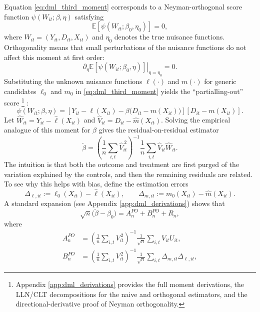 \documentclass[11pt,oneside,a4paper]{book}
\begin{document}
Equation \eqref{eq:dml_third_moment} corresponds to a Neyman-orthogonal score function \(\psi(W_{it};\beta,\eta)\) satisfying \[ 
\mathbb{E}[\psi(W_{it};\beta_0,\eta_0)] = 0, \] where \(W_{it}=(Y_{it},D_{it},X_{it})\) and \(\eta_0\) denotes the true nuisance functions. Orthogonality means that small perturbations of the nuisance functions do not affect this moment at first order:
\begin{equation*}
\left.
\partial_{\eta}
\mathbb{E}\!\left[\psi(W_{it};\beta_0,\eta)\right]
\right|_{\eta=\eta_0}
=0.
\end{equation*}
Substituting the unknown nuisance functions \(\ell(\cdot)\) and \(m(\cdot)\) for generic candidates \(\ell_0\) and \(m_0\) in \eqref{eq:dml_third_moment} yields the “partialling-out” score \footnote{Appendix \ref{app:dml_derivations} provides the full moment derivations, the LLN/CLT decompositions for the naive and orthogonal estimators, and the directional-derivative proof of Neyman orthogonality.} :
\begin{equation}
\psi(W_{it};\beta,\eta)
=
\left[
Y_{it}-\ell(X_{it})
-\beta\bigl(D_{it}-m(X_{it})\bigr)
\right]
\left[
D_{it}-m(X_{it})
\right].
\label{eq:dml_background_score}
\end{equation}
Let \(\hat W_{it} = Y_{it}-\hat\ell(X_{it})\) and \(\hat V_{it} = D_{it}-\hat m(X_{it})\).  Solving the empirical analogue of this moment for \(\beta\) gives the residual-on-residual estimator
\begin{equation*}
\check{\beta}
=
\left(
\frac{1}{n}\sum_{i,t}\widehat{V}_{it}^{\,2}
\right)^{-1}
\frac{1}{n}\sum_{i,t}\widehat{V}_{it}\widehat{W}_{it}.
\end{equation*}
The intuition is that both the outcome and treatment are first purged of the variation explained by the controls, and then the remaining residuals are related. To see why this helps with bias, define the estimation errors 
\begin{equation*}
\Delta_{\ell,it}
:=
\ell_0(X_{it})-\widehat{\ell}(X_{it}),
\qquad
\Delta_{m,it}
:=
m_0(X_{it})-\widehat{m}(X_{it}).
\end{equation*}
A standard expansion (see Appendix \ref{app:dml_derivations}) shows that
\begin{equation}
\sqrt{n}\bigl(\check{\beta}-\beta_0\bigr)
=
A_n^{PO}+B_n^{PO}+R_n,
\label{eq:dml_background_decomposition}
\end{equation}
where
\begin{align*}
A_n^{PO}
&=
\left(
\frac{1}{n}\sum_{i,t}V_{it}^{\,2}
\right)^{-1}
\frac{1}{\sqrt{n}}\sum_{i,t}V_{it}U_{it}, \\
B_n^{PO}
&=
\left(
\frac{1}{n}\sum_{i,t}V_{it}^{\,2}
\right)^{-1}
\frac{1}{\sqrt{n}}\sum_{i,t}
\Delta_{m,it}\Delta_{\ell,it},
\end{align*}
\end{document}
